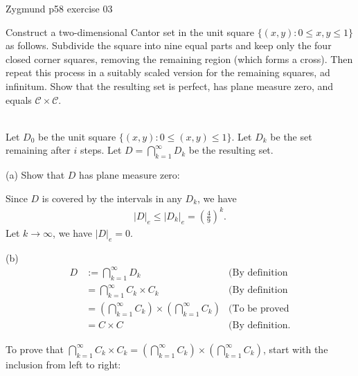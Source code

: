 \documentclass[UTF8,a4paper,10pt]{article}
\begin{document}
  \begin{Problem}[]{Zygmund p58 exercise 03}

    Construct a two-dimensional Cantor set in the unit square $\{(x, y) : 0 \leq x, y \leq 1\}$ as follows. Subdivide the square into nine equal parts and keep only the four closed corner squares, removing the remaining region (which forms a cross). Then repeat this process in a suitably scaled version for the remaining squares, ad infinitum. Show that the resulting set is perfect, has plane measure zero, and equals $\mathcal{C} \times \mathcal{C}$.
  
  \end{Problem}


  \begin{solution}\,\\
    Let \(D_0\) be the unit square \(\{(x,y): 0\leq (x,y)\leq 1\}\). Let \(D_k\) be the set remaining after \(i\) steps. Let \(D = \bigcap_{k=1}^{\infty} D_k \) be the resulting set.

  

    (a) Show that \(D\) has plane measure
    zero:

    Since \(D\) is covered by the intervals in any \(D_k\), we have
    \begin{equation*}
      \begin{aligned}
        \left\lvert D\right\rvert_e \leq \left\lvert D_k \right\rvert_e = \left(\frac{4}{9}\right)^{k}.
      \end{aligned}
    \end{equation*}
    Let \(k\to\infty\), we have \(\left\lvert D\right\rvert_e = 0\).


    (b)
    \begin{equation*}
      \begin{aligned}
        D &:= \bigcap_{k=1}^{\infty} D_k &\text{(By definition}\\
        &= \bigcap_{k=1}^{\infty} C_k \times C_k &\text{(By definition}\\
        &=  \left(\bigcap_{k=1}^{\infty} C_k\right) \times \left(\bigcap_{k=1}^{\infty} C_k\right) &\text{(To be proved}\\
        &= C\times C&\text{(By definition}.
      \end{aligned}
    \end{equation*}

    To prove that \(\bigcap_{k=1}^{\infty} C_k \times C_k = \left(\bigcap_{k=1}^{\infty} C_k\right) \times \left(\bigcap_{k=1}^{\infty} C_k\right) \), start with the inclusion from left to right:


\end{solution}
\end{document}

